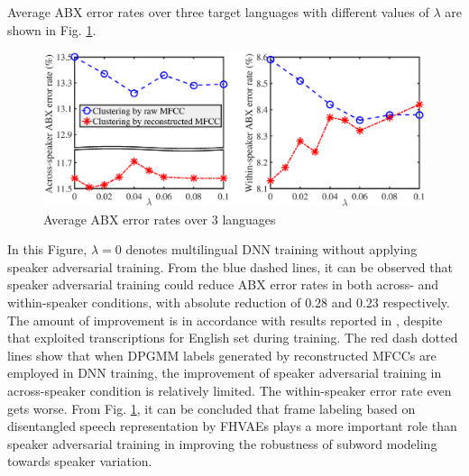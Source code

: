 \documentclass[a4paper]{article}
\begin{document}
Average ABX error rates over three target languages with different values of $\lambda$ are shown in Fig. \ref{fig:amtl}. 
\begin{figure}[t]
    \centering
    \includegraphics[width = 0.9\linewidth]{adv_results2_breakyaxis_export_setup.eps}
    \caption{Average ABX error rates over $3$ languages }
    \label{fig:amtl}
\end{figure}
In this Figure, $\lambda=0$ denotes multilingual DNN training without applying speaker adversarial training. 
From the blue dashed lines, it can be observed that speaker adversarial training could reduce ABX error rates in both across- and within-speaker conditions, with absolute reduction of $0.28$ and $0.23$ respectively. The amount of  improvement is in accordance with results reported in \cite{Tsuchiya2018speaker}, despite that  \cite{Tsuchiya2018speaker} exploited transcriptions for English set during training.
The red dash dotted lines show that when  DPGMM labels generated by reconstructed MFCCs are employed in DNN training, the improvement of speaker adversarial training in  across-speaker condition is relatively limited. 
The within-speaker error rate even gets worse. 
From  Fig. \ref{fig:amtl}, it can be concluded  that frame labeling based on disentangled speech representation by FHVAEs plays a more important role  than speaker adversarial training in improving the robustness of subword modeling towards speaker variation.

\end{document}
